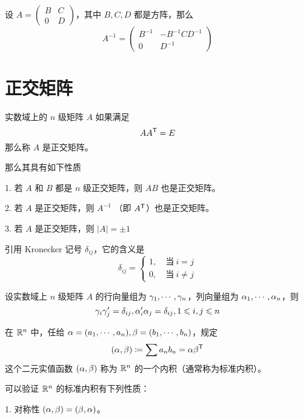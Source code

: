 \begin{theorem}
    设 $A = \left(\begin{matrix} B & C\\ 0 & D \end{matrix}\right)$，其中 $B,C,D$ 都是方阵，那么
    \[A^{-1} = \left(\begin{matrix} B^{-1} & -B^{-1}CD^{-1}\\ 0 & D^{-1} \end{matrix}\right)\]
\end{theorem}

\section{正交矩阵}

\begin{definition}
    实数域上的 $n$ 级矩阵 $A$ 如果满足
    \[A{A}^\mathsf{T}=E\]
    那么称 $A$ 是正交矩阵。
\end{definition}

那么其具有如下性质

1. 若 $A$ 和  $B$ 都是 $n$ 级正交矩阵，则 $AB$ 也是正交矩阵。

2. 若 $A$ 是正交矩阵，则 $A^{-1}$ （即 ${A}^\mathsf{T}$）也是正交矩阵。

3. 若 $A$ 是正交矩阵，则 $|A|=\pm 1$


引用 Kronecker 记号 $\delta_{ij}$，它的含义是
\[\delta_{ij}=\begin{cases}
    1,\quad \text{当}\ i=j\\
    0,\quad \text{当}\ i\ne j
\end{cases}\]

\begin{theorem}
    设实数域上 $n$ 级矩阵 $A$ 的行向量组为 $\gamma_1,\cdots,\gamma_n$，列向量组为 $\alpha_1,\cdots,\alpha_n$，则
    \[\gamma_i\gamma_j'=\delta_{ij},\alpha_i'\alpha_j=\delta_{ij},1 \leqslant i,j \leqslant n\]
\end{theorem}

\begin{definition}
    在 $\mathbb{R}^n$ 中，任给 $\alpha = (a_1,\cdots,a_n),\beta=(b_1,\cdots,b_n)$，规定
    \[(\alpha,\beta) \coloneqq  \sum a_nb_n = \alpha{\beta}^\mathsf{T}\]
    这个二元实值函数 $(\alpha,\beta)$ 称为 $\mathbb{R}^n$ 的一个内积（通常称为标准内积）。
\end{definition}

可以验证 $\mathbb{R}^n$ 的标准内积有下列性质：

1. 对称性 $(\alpha,\beta) = (\beta,\alpha)$。

